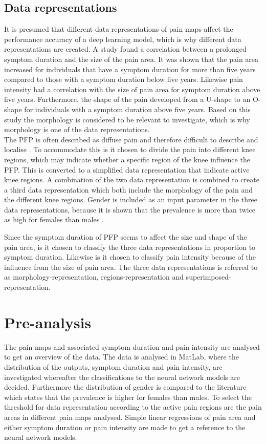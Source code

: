 \subsection{Data representations}
It is presumed that different data representations of pain maps affect the performance
accuracy of a deep learning model, which is why different data representations are created. 
A study found a correlation between a prolonged symptom duration and the size of the pain area. It was shown that the pain area increased for individuals that have a symptom duration for more than five years compared to those with a symptom duration below five years. Likewise pain intensity had a correlation with the size of pain area for symptom duration above five years. Furthermore, the shape of the pain developed from a U-shape to an O-shape for individuals with a symptom duration above five years.\citep{Boudreau2017} Based on this study the morphology is considered to be relevant to investigate, which is why morphology is one of the data representations.\\

\noindent
The PFP is often described as diffuse pain and therefore difficult to describe and localise \citep{Witvrouw2014}. To accommodate this is it chosen to divide the pain into different knee regions, which may indicate whether a specific region of the knee influence the PFP. This is converted to a simplified data representation that indicate active knee regions. 
A combination of the two data representation is combined to create a third data representation which both include the morphology of the pain and the different knee regions. 
Gender is included as an input parameter in the three data representations, because it is shown that the prevalence is more than twice as high for females than males \citep{Petersen2013, Rathleff2015}.  

\noindent
Since the symptom duration of PFP seems to affect the size and shape of the pain area, is it chosen to classify the three data representations in proportion to symptom duration. Likewise is it chosen to classify pain intensity because of the influence from the size of pain area.
The three data representations is referred to as morphology-representation, regions-representation and superimposed-representation.


\section{Pre-analysis}
The pain maps and associated symptom duration and pain intensity are analysed to get an overview of the data. The data is analysed in MatLab, where the distribution of the outputs, symptom duration and pain intensity, are investigated whereafter the classifications to the neural network models are decided. Furthermore the distribution of gender is compared to the literature which states that the prevalence is higher for females than males.
To select the threshold for data representation according to the active pain regions are the pain areas in different pain maps analysed. 
Simple linear regressions of pain area and either symptom duration or pain intensity are made to get a reference to the neural network models. 


